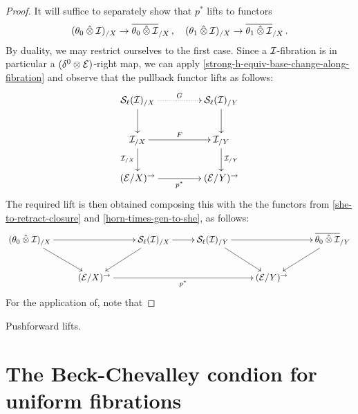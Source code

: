 \documentclass[reqno,10pt,a4paper,oneside]{amsart}
\begin{document}
\begin{proof}
It will suffice to separately show that $p^*$ lifts to functors 
\[
 (\thetal \hatotimes \cal{I})_{/X} \to \overline{\thetal \hatotimes \cal{I}}_{/X} \, , \quad
 (\thetar \hatotimes \cal{I})_{/X} \to \overline{\thetar \hatotimes \cal{I}}_{/X} \, .
 \]
By duality, we may restrict ourselves to the first case. Since a $\cal{I}$-fibration is in particular a $(\lcyl \otimes \calE)$-right map,
we can apply  \cref{strong-h-equiv-base-change-along-fibration} and observe that the pullback functor lifts as follows:
\[
\xymatrix@C+2em{
  \cal{S}_\ell(\cal{I})_{/X}
  \ar@{.>}[r]^{G}
  \ar[d]
&
  \cal{S}_\ell(\cal{I})_{/Y}
  \ar[d]
\\
  \cal{I}_{/X}
  \ar[r]^{F}
  \ar[d]_{\cal{I}_{/X}}
&
  \cal{I}_{/Y}
  \ar[d]^{\cal{I}_{/Y}}
\\
  (\catE / X)^{\to}
  \ar[r]_{p^*}
&
  (\catE / Y)^{\to}
}
\]
 The required lift is then obtained composing this with the the functors from \cref{she-to-retract-closure}
 and \cref{horn-times-gen-to-she}, as follows:
\[
\xymatrix{
  (\thetal \hatotimes \cal{I})_{/X} 
  \ar[rr]
  \ar[dr] & 
&
  \cal{S}_\ell(\cal{I})_{/X}
  \ar[r]
  \ar[dl]
&
  \cal{S}_\ell(\cal{I})_{/Y}
  \ar[rr]
  \ar[dr]
& &
  \overline{\thetal \hatotimes \cal{I}}_{/Y}
  \ar[dl]
\\ & 
  (\catE/X)^{\to}
  \ar[rrr]_{p^*}
&&&
  (\catE/Y)^{\to} & 
}
\]
For the application of, note that \end{proof}

\begin{corollary}
Pushforward lifts.
\end{corollary}



\section{The Beck-Chevalley condion for uniform fibrations}
\end{document}
